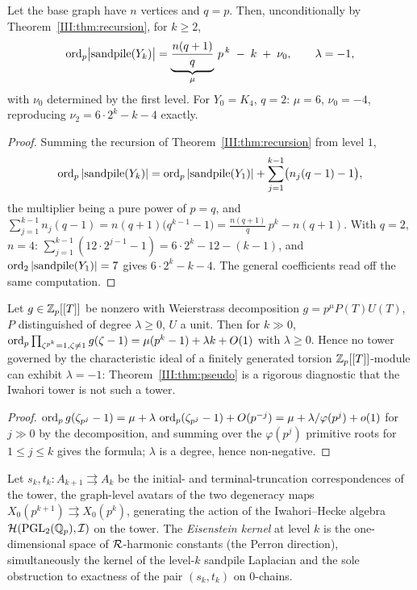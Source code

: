 \begin{theorem}\label{III:thm:pseudo}
Let the base graph have $n$ vertices and $q=p$. Then, unconditionally by
Theorem~\ref{III:thm:recursion},
for $k\ge2$,
\[
\operatorname{ord}_p\bigl|\mathrm{sandpile}(Y_k)\bigr|
=\underbrace{\frac{n(q+1)}{q}}_{\mu}\,p^{\,k}\;-\;k\;+\;\nu_0,
\qquad
\lambda=-1,
\]
with $\nu_0$ determined by the first level. For $Y_0=K_4$, $q=2$:
$\mu=6$, $\nu_0=-4$, reproducing $\nu_2=6\cdot2^k-k-4$ exactly.
\end{theorem}

\begin{proof}
Summing the recursion of Theorem~\ref{III:thm:recursion} from level $1$,
\[
\operatorname{ord}_p|\mathrm{sandpile}(Y_k)|
=\operatorname{ord}_p|\mathrm{sandpile}(Y_1)|+\sum_{j=1}^{k-1}\bigl(n_j(q-1)-1\bigr),
\]
the multiplier being a pure power of $p=q$, and
$\sum_{j=1}^{k-1}n_j(q-1)=n(q+1)\bigl(q^{k-1}-1\bigr)=\tfrac{n(q+1)}q\,p^{k}-n(q+1)$.
With $q=2$, $n=4$: $\sum_{j=1}^{k-1}(12\cdot2^{j-1}-1)=6\cdot2^{k}-12-(k-1)$, and
$\operatorname{ord}_2|\mathrm{sandpile}(Y_1)|=7$ gives $6\cdot2^k-k-4$. The general coefficients
read off the same computation.
\end{proof}

\begin{proposition}\label{III:prop:lampos}
Let $g\in\mathbb{Z}_p[[T]]$ be nonzero with Weierstrass decomposition
$g=p^{\mu}P(T)U(T)$, $P$ distinguished of degree $\lambda\ge0$, $U$ a unit. Then for
$k\gg0$,
$\operatorname{ord}_p\prod_{\zeta^{p^k}=1,\zeta\neq1}g(\zeta-1)=\mu(p^k-1)+\lambda k+O(1)$
with $\lambda\ge0$. Hence no tower governed by the characteristic ideal of a finitely
generated torsion $\mathbb{Z}_p[[T]]$-module can exhibit $\lambda=-1$: Theorem~\ref{III:thm:pseudo}
is a rigorous diagnostic that the Iwahori tower is not such a tower.
\end{proposition}

\begin{proof}
$\operatorname{ord}_p g(\zeta_{p^j}-1)=\mu+\lambda\,\operatorname{ord}_p(\zeta_{p^j}-1)+O(p^{-j})
=\mu+\lambda/\varphi(p^j)+o(1)$ for $j\gg0$ by the decomposition, and summing over the
$\varphi(p^j)$ primitive roots for $1\le j\le k$ gives the formula; $\lambda$ is a
degree, hence non-negative.
\end{proof}

\begin{definition}\label{III:def:degeneracy}
Let $s_k,t_k\colon A_{k+1}\rightrightarrows A_k$ be the initial- and
terminal-truncation correspondences of the tower, the graph-level avatars of the two
degeneracy maps $X_0(p^{k+1})\rightrightarrows X_0(p^k)$, generating the action of the
Iwahori--Hecke algebra $\mathcal{H}(\mathrm{PGL}_2(\mathbb{Q}_p),\mathcal{I})$ on the tower. The \emph{Eisenstein
kernel} at level $k$ is the one-dimensional space of $\mathcal{R}$-harmonic constants (the
Perron direction), simultaneously the kernel of the level-$k$ sandpile Laplacian and
the sole obstruction to exactness of the pair $(s_k,t_k)$ on $0$-chains.
\end{definition}

